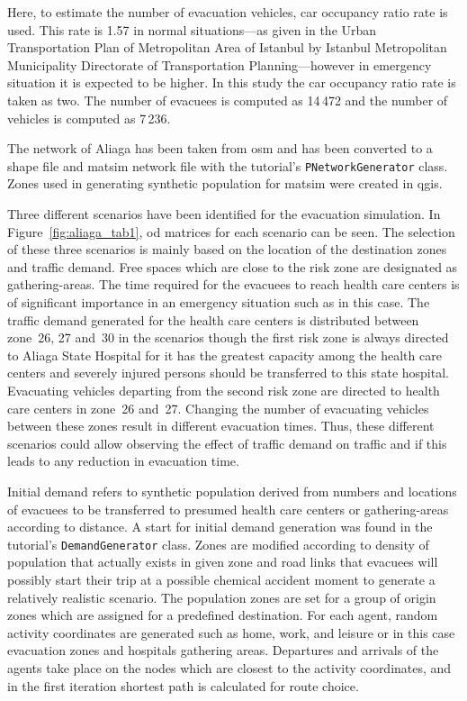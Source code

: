 Here, to estimate the number of evacuation vehicles, car occupancy ratio rate is used. This rate is 1.57 in normal situations---as given in the Urban Transportation Plan of Metropolitan Area of Istanbul by
Istanbul Metropolitan Municipality Directorate of Transportation Planning---however in emergency situation it is expected to be higher. In this study the car occupancy ratio rate is taken as two. The number of evacuees is computed as 14\,472 and the number of vehicles is computed as 7\,236.

The network of Aliaga has been taken from \gls{osm} and has been converted to a shape file and \gls{matsim} network file with the tutorial's \lstinline|PNetworkGenerator| class. %
Zones used in generating synthetic population for \gls{matsim} were created in \gls{qgis}.

Three different scenarios have been identified for the evacuation simulation. In Figure~\ref{fig:aliaga_tab1}, \gls{od} matrices for each scenario can be seen. The selection of these three scenarios is mainly based on the location of the destination zones and traffic demand. Free spaces which are close to the risk zone are designated as gathering-areas. The time required for the evacuees to reach health care centers is of significant importance in an emergency situation such as in this case. The traffic demand generated for the health care centers is distributed between zone~26, 27 and~30 in the scenarios though the first risk zone is always directed to Aliaga State Hospital for it has the greatest capacity among the health care centers and severely injured persons should be transferred to this state hospital. Evacuating vehicles departing from the second risk zone are directed to health care centers in zone~26 and~27. Changing the number of evacuating vehicles between these zones result in different evacuation times. Thus, these different scenarios could allow observing the effect of traffic demand on traffic and if this leads to any reduction in evacuation time.

Initial demand refers to synthetic population derived from numbers and locations of evacuees to be transferred to presumed health care centers or gathering-areas according to distance. 
A start for initial demand generation was found in the tutorial's \lstinline|DemandGenerator| class. %
Zones are modified according to density of population that actually exists in given zone and road links that evacuees will possibly start their trip at a possible chemical accident moment to generate a relatively realistic scenario. The population zones are set for a group of origin zones which are assigned for a predefined destination. For each agent, random activity coordinates are generated such as home, work, and leisure or in this case evacuation zones and hospitals gathering areas. Departures and arrivals of the agents take place on the nodes which are closest to the activity coordinates, and in the first iteration shortest path is calculated for route choice.

